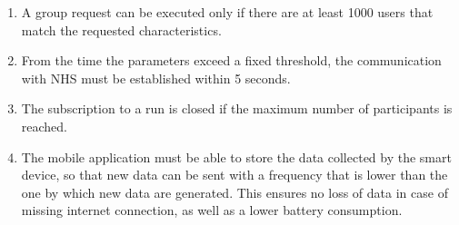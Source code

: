 \begin{enumerate}
    \item\label{c:1} A group request can be executed only if there are at least 1000 users that match the requested characteristics.
    \item\label{c:2}
    From the time the parameters exceed a fixed threshold, the communication with NHS must be established within 5 seconds.
    \item\label{c:3}
    The subscription to a run is closed if the maximum number of participants is reached.
    \item\label{c:4}
    The mobile application must be able to store the data collected by the smart device, so that new data can be sent with a frequency that is lower than the one by which new data are generated. This ensures no loss of data in case of missing internet connection, as well as a lower battery consumption. 
\end{enumerate}


